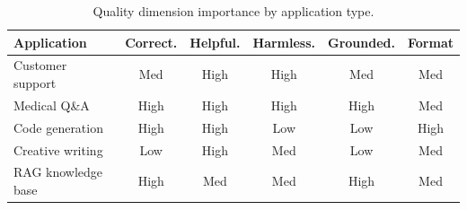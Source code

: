 \begin{table}[h]
\centering
\caption{Quality dimension importance by application type.}
\label{tab:quality-dimensions}
\begin{tabular}{@{}lccccc@{}}
\toprule
\textbf{Application} & \textbf{Correct.} & \textbf{Helpful.} & \textbf{Harmless.} & \textbf{Grounded.} & \textbf{Format} \\
\midrule
Customer support   & Med  & High & High & Med  & Med \\
Medical Q\&A       & High & High & High & High & Med \\
Code generation    & High & High & Low  & Low  & High \\
Creative writing   & Low  & High & Med  & Low  & Med \\
RAG knowledge base & High & Med  & Med  & High & Med \\
\bottomrule
\end{tabular}
\end{table}

